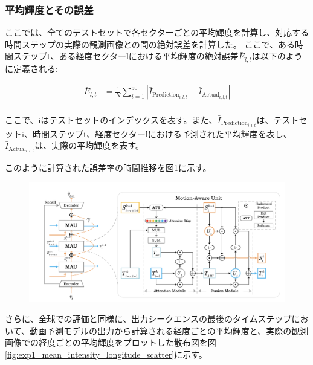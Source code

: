         \subsubsection{平均輝度とその誤差}
          ここでは、全てのテストセットで各セクターごとの平均輝度を計算し、対応する時間ステップの実際の観測画像との間の絶対誤差を計算した。
          ここで、ある時間ステップt、ある経度セクターlにおける平均輝度の絶対誤差\( \bar{E}_{l,t} \)は以下のように定義される:
          
          \begin{align}
            \bar{E}_{l, t} & = \frac{1}{N} \sum_{i=1}^{50} | \bar{I}_{\text{Prediction}_ {i, l, t}} - \bar{I}_{\text{Actual}_{i, l, t}} | \\
          \end{align}
            
          ここで、iはテストセットのインデックスを表す。また、\( \bar{I}_{\text{Prediction}_{i, l, t}} \)は、テストセットi、時間ステップt、経度セクターlにおける予測された平均輝度を表し、\( \bar{I}_{\text{Actual}_{i, l, t}} \)は、実際の平均輝度を表す。  

          このように計算された誤差率の時間推移を図\ref{fig:exp1_mean_intensity_longitude_line}に示す。
          
          \begin{figure}[h]
            \centering
            \includegraphics[width=150mm]{figures/mau.png}
            \caption{}
            \label{fig:exp1_mean_intensity_longitude_line}
          \end{figure}
          
          さらに、全球での評価と同様に、出力シークエンスの最後のタイムステップにおいて、動画予測モデルの出力から計算される経度ごとの平均輝度と、実際の観測画像での経度ごとの平均輝度をプロットした散布図を図\ref{fig:exp1_mean_intensity_longitude_scatter}に示す。
          
